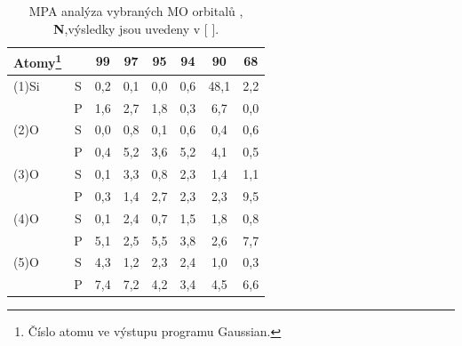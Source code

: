 \documentclass[
digital, %
table,   %
lof,     %
lot,     %
oneside,
]{fithesis3}
\begin{document}
\begin{table}[htbp]\begin{minipage}{\textwidth}
\caption{MPA analýza vybraných MO orbitalů , \textbf{N},výsledky jsou uvedeny v [ ].}
\begin{center}
\begin{tabular}{|l|c|c|c|c|c|c|c|}
\hline
Atomy\footnote{Číslo atomu ve výstupu programu Gaussian.}  \label{si_model_orezany_MPA} &  & 99 & 97 & 95 & 94 & 90 & 68 \\ \hline
(1)Si & S  & 0,2  & 0,1  & 0,0  & 0,6  & 48,1  & 2,2  \\ \hline
& P & 1,6  & 2,7  & 1,8  & 0,3  & 6,7  & 0,0  \\ \hline
(2)O & S  & 0,0  & 0,8  & 0,1  & 0,6  & 0,4  & 0,6  \\ \hline
& P & 0,4  & 5,2  & 3,6  & 5,2  & 4,1  & 0,5  \\ \hline
(3)O & S  & 0,1  & 3,3  & 0,8  & 2,3  & 1,4  & 1,1  \\ \hline
& P & 0,3  & 1,4  & 2,7  & 2,3  & 2,3  & 9,5  \\ \hline
(4)O & S  & 0,1  & 2,4  & 0,7  & 1,5  & 1,8  & 0,8  \\ \hline
& P & 5,1  & 2,5  & 5,5  & 3,8  & 2,6  & 7,7  \\ \hline
(5)O & S  & 4,3  & 1,2  & 2,3  & 2,4  & 1,0  & 0,3  \\ \hline
& P & 7,4  & 7,2  & 4,2  & 3,4  & 4,5  & 6,6 \\ \hline
\end{tabular}
\end{center}\end{minipage}\end{table}
\end{document}
